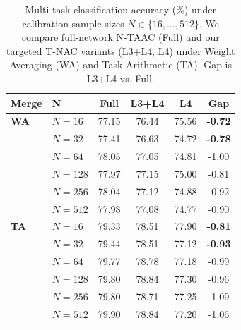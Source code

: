 \documentclass{article}
\theoremstyle{plain}
\theoremstyle{definition}
\begin{document}
\begin{table}[ht]
\caption{Multi-task classification accuracy (\%) under calibration sample sizes $N \in \{16, \dots, 512\}$. We compare full-network N-TAAC (Full) and our targeted T-NAC variants (L3+L4, L4) under Weight Averaging (WA) and Task Arithmetic (TA). Gap is L3+L4 vs. Full.}
\label{tab:ablation_results}
\begin{center}
\begin{footnotesize}
\setlength{\tabcolsep}{3.0pt}
\begin{tabular}{llcccc}
\toprule
\textbf{Merge} & \textbf{N} & \textbf{Full} & \textbf{L3+L4} & \textbf{L4} & \textbf{Gap} \\
\midrule
\textbf{WA} & $N=16$  & 77.15 & 76.44 & 75.56 & \textbf{-0.72} \\
& $N=32$  & 77.41 & 76.63 & 74.72 & \textbf{-0.78} \\
& $N=64$  & 78.05 & 77.05 & 74.81 & -1.00 \\
& $N=128$ & 77.97 & 77.15 & 75.00 & -0.81 \\
& $N=256$ & 78.04 & 77.12 & 74.88 & -0.92 \\
& $N=512$ & 77.98 & 77.08 & 74.77 & -0.90 \\
\midrule
\textbf{TA} & $N=16$  & 79.33 & 78.51 & 77.90 & \textbf{-0.81} \\
& $N=32$  & 79.44 & 78.51 & 77.12 & \textbf{-0.93} \\
& $N=64$  & 79.77 & 78.78 & 77.18 & -0.99 \\
& $N=128$ & 79.80 & 78.84 & 77.30 & -0.96 \\
& $N=256$ & 79.80 & 78.71 & 77.25 & -1.09 \\
& $N=512$ & 79.90 & 78.84 & 77.20 & -1.06 \\
\bottomrule
\end{tabular}
\end{footnotesize}
\end{center}
\end{table}
\end{document}
